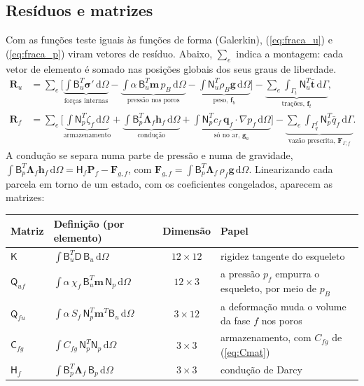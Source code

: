 \documentclass[11pt,a4paper]{article}
\newcommand{\vq}{\bm q}
\newcommand{\vg}{\bm g}
\newcommand{\vt}{\bm t}
\newcommand{\tsig}{\bm\sigma}
\newcommand{\mt}[1]{\mathsf{#1}}
\newcommand{\dd}{\mathrm d}
\begin{document}
\subsection{Resíduos e matrizes}
\label{sec:matrizes}
Com as funções teste iguais às funções de forma (Galerkin), (\ref{eq:fraca_u}) e
(\ref{eq:fraca_p}) viram vetores de resíduo. Abaixo, $\sum_e$ indica a montagem: cada vetor
de elemento é somado nas posições globais dos seus graus de liberdade.
\begin{align}
\mathbf R_u&=\sum_e\Big[\underbrace{\int\mt B_u^T\tsig'\,\dd\Omega}_{\text{forças internas}}
-\underbrace{\int\alpha\,\mt B_u^T\bm m\,p_B\,\dd\Omega}_{\text{pressão nos poros}}
-\underbrace{\int\mt N_u^T\rho_B\vg\,\dd\Omega}_{\text{peso, }\mathbf f_b}\Big]
-\underbrace{\sum_e\int_{\Gamma_t}\mt N_u^T\bar{\vt}\,\dd\Gamma}_{\text{trações, }\mathbf f_t},
\label{eq:Ru}\\
\mathbf R_f&=\sum_e\Big[\underbrace{\int\mt N_p^T\dot\zeta_f\,\dd\Omega}_{\text{armazenamento}}
+\underbrace{\int\mt B_p^T\bm\Lambda_f\bm h_f\,\dd\Omega}_{\text{condução}}
+\underbrace{\int\mt N_p^Tc_f\,\vq_f\cdot\nabla p_f\,\dd\Omega}_{\text{só no ar, }\mathbf g_a}\Big]
-\underbrace{\sum_e\int_{\Gamma_q^f}\mt N_p^T\bar q_f\,\dd\Gamma}_{\text{vazão prescrita, }\mathbf F_{\Gamma,f}} .
\label{eq:Rf}
\end{align}
A condução se separa numa parte de pressão e numa de gravidade,
$\int\mt B_p^T\bm\Lambda_f\bm h_f\,\dd\Omega=\mt H_f\mathbf P_f-\mathbf F_{g,f}$, com
$\mathbf F_{g,f}=\int\mt B_p^T\bm\Lambda_f\,\rho_f\vg\,\dd\Omega$. Linearizando cada parcela
em torno de um estado, com os coeficientes congelados, aparecem as matrizes:

\begin{center}\small
\begin{tabularx}{\textwidth}{@{}l l c X@{}}
\toprule
Matriz & Definição (por elemento) & Dimensão & Papel\\
\midrule
$\mt K$ & $\int\mt B_u^T\mt D\,\mt B_u\,\dd\Omega$ & $12\times12$
  & rigidez tangente do esqueleto\\
$\mt Q_{uf}$ & $\int\alpha\,\chi_f\,\mt B_u^T\bm m\,\mt N_p\,\dd\Omega$ & $12\times3$
  & a pressão $p_f$ empurra o esqueleto, por meio de $p_B$\\
$\mt Q_{fu}$ & $\int\alpha\,S_f\,\mt N_p^T\bm m^T\mt B_u\,\dd\Omega$ & $3\times12$
  & a deformação muda o volume da fase $f$ nos poros\\
$\mt C_{fg}$ & $\int C_{fg}\,\mt N_p^T\mt N_p\,\dd\Omega$ & $3\times3$
  & armazenamento, com $C_{fg}$ de (\ref{eq:Cmat})\\
$\mt H_f$ & $\int\mt B_p^T\bm\Lambda_f\,\mt B_p\,\dd\Omega$ & $3\times3$
  & condução de Darcy\\
\bottomrule
\end{tabularx}
\end{center}
\end{document}
